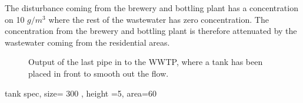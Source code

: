 The disturbance coming from the brewery and bottling plant has a concentration on 10 $g/m^3$ where the rest of the wastewater has zero concentration. The concentration from the brewery and bottling plant is therefore attenuated by the wastewater coming from the residential areas. 



\begin{figure}[H]
\centering

\caption{Output of the last pipe in to the WWTP, where a tank has been placed in front to smooth out the flow.}
\label{fig:simulation_output_second}
\end{figure} 

tank spec, size=  300 , height =5,	area=60
			   